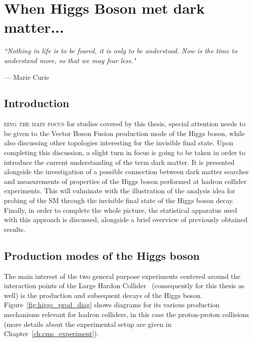 \chapter{When Higgs Boson met dark matter...}
\epigraph{\itshape``Nothing in life is to be feared, it is only to be understood. Now is the time to understand more, so that we may fear less."}{--- \textup{Marie Curie}}
\label{ch:Higgs_LHC_DM}
\section{Introduction}


\hspace{10pt}\lettrine[lines=2]{}{eing the main focus} for studies covered by this thesis, special attention needs to be given to the Vector Boson Fusion production mode of the Higgs boson, while also discussing other topologies interesting for the invisible final state. Upon completing this discussion, a slight turn in focus is going to be taken in order to introduce the current understanding of the term dark matter. It is presented alongside the investigation of a possible connection between dark matter searches and measurements of properties of the Higgs boson performed at hadron collider experiments. This will culminate with the illustration of the analysis idea for probing of the SM through the invisible final state of the Higgs boson decay. Finally, in order to complete the whole picture, the statistical apparatus used with this approach is discussed, alongside a brief overview of previously obtained results.


\section{Production modes of the Higgs boson}
\label{sec:prod_higgs}
\hspace{10pt} The main interest of the two general purpose experiments centered around the interaction points of the Large Hardon Collider~\cite{LHC_TDR} (consequently for this thesis as well) is the production and subsequent decays of the Higgs boson. Figure~\ref{fig:higgs_prod_diag} shows diagrams for its various production mechanisms relevant for hadron colliders, in this case the proton-proton collisions (more details about the experimental setup are given in Chapter~\ref{ch:cms_experiment}).

